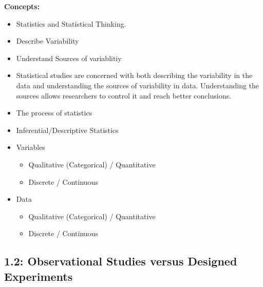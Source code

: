 \documentclass{report}
\begin{document}
        \bigbreak \noindent 
        \textbf{Concepts:}
        \begin{itemize}
            \item Statistics and Statistical Thinking.
            \item Describe Variability
            \item Understand Sources of variablitiy
            \item Statistical studies are concerned with both describing the variability in the data and understanding the sources of variability in data. Understanding the sources allows researchers to control it and reach better conclusions.
            \item The process of statistics
            \item Inferential/Descriptive Statistics
            \item Variables
                \begin{itemize}
                    \item Qualitative (Categorical) / Quantitative
                    \item Discrete / Continuous
                \end{itemize}
            \item Data
                \begin{itemize}
                    \item Qualitative (Categorical) / Quantitative
                    \item Discrete / Continuous
                \end{itemize}
        \end{itemize}

        \pagebreak \bigbreak \noindent
        \subsection{1.2: Observational Studies versus Designed Experiments}
        \bigbreak \noindent 

    
\end{document}
